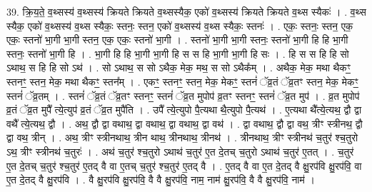 \documentclass[17pt]{extarticle}
\begin{document}
39. क्रि॒य॒ते॒ व॒थ्सस्य॑ व॒थ्सस्य॑ क्रियते क्रियते व॒थ्सस्यैक॒ एको॑ व॒थ्सस्य॑ क्रियते क्रियते व॒थ्स स्यैकः॑ । . व॒थ्स स्यैक॒ एको॑ व॒थ्सस्य॑ व॒थ्स स्यैकः॒ स्तनः॒ स्तन॒ एको॑ व॒थ्सस्य॑ व॒थ्स स्यैकः॒ स्तनः॑ । . एकः॒ स्तनः॒ स्तन॒ एक॒ एकः॒ स्तनो॑ भा॒गी भा॒गी स्तन॒ एक॒ एकः॒ स्तनो॑ भा॒गी । . स्तनो॑ भा॒गी भा॒गी स्तनः॒ स्तनो॑ भा॒गी हि हि भा॒गी स्तनः॒ स्तनो॑ भा॒गी हि । . भा॒गी हि हि भा॒गी भा॒गी हि स स हि भा॒गी भा॒गी हि सः । . हि स स हि हि सो ऽथाथ॒ स हि हि सो ऽथ॑ । . सो ऽथाथ॒ स सो ऽथैक॒ मेक॒ मथ॒ स सो ऽथैक᳚म् । . अथैक॒ मेक॒ मथा थैकꣳ॒॒ स्तनꣳ॒॒ स्तन॒ मेक॒ मथा थैकꣳ॒॒ स्तन᳚म् । . एकꣳ॒॒ स्तनꣳ॒॒ स्तन॒ मेक॒ मेकꣳ॒॒ स्तनं॑ ॅव्र॒तं ॅव्र॒तꣳ स्तन॒ मेक॒ मेकꣳ॒॒ स्तनं॑ ॅव्र॒तम् । . स्तनं॑ ॅव्र॒तं ॅव्र॒तꣳ स्तनꣳ॒॒ स्तनं॑ ॅव्र॒त मुपोप॑ व्र॒तꣳ स्तनꣳ॒॒ स्तनं॑ ॅव्र॒त मुप॑ । . व्र॒त मुपोप॑ व्र॒तं ॅव्र॒त मुपै᳚ त्ये॒त्युप॑ व्र॒तं ॅव्र॒त मुपै॑ति । . उपै᳚ त्ये॒त्युपो पै॒त्यथा थै॒त्युपो पै॒त्यथ॑ । . ए॒त्यथा थै᳚त्ये॒त्यथ॒ द्वौ द्वा वथै᳚ त्ये॒त्यथ॒ द्वौ । . अथ॒ द्वौ द्वा वथाथ॒ द्वा वथाथ॒ द्वा वथाथ॒ द्वा वथ॑ । . द्वा वथाथ॒ द्वौ द्वा वथ॒ त्रीꣳ स्त्रीनथ॒ द्वौ द्वा वथ॒ त्रीन् । . अथ॒ त्रीꣳ स्त्रीनथाथ॒ त्रीन थाथ॒ त्रीनथाथ॒ त्रीनथ॑ । . त्रीनथाथ॒ त्रीꣳ स्त्रीनथ॑ च॒तुर॑ श्च॒तुरो ऽथ॒ त्रीꣳ स्त्रीनथ॑ च॒तुरः॑ । . अथ॑ च॒तुर॑ श्च॒तुरो ऽथाथ॑ च॒तुर॑ ए॒त दे॒तच् च॒तुरो ऽथाथ॑ च॒तुर॑ ए॒तत् । . च॒तुर॑ ए॒त दे॒तच् च॒तुर॑ श्च॒तुर॑ ए॒तद् वै वा ए॒तच् च॒तुर॑ श्च॒तुर॑ ए॒तद् वै । . ए॒तद् वै वा ए॒त दे॒तद् वै क्षु॒रप॑वि क्षु॒रप॑वि॒ वा ए॒त दे॒तद् वै क्षु॒रप॑वि । . वै क्षु॒रप॑वि क्षु॒रप॑वि॒ वै वै क्षु॒रप॑वि॒ नाम॒ नाम॑ क्षु॒रप॑वि॒ वै वै क्षु॒रप॑वि॒ नाम॑ । \newline
\pagebreak
{}
\end{document}
